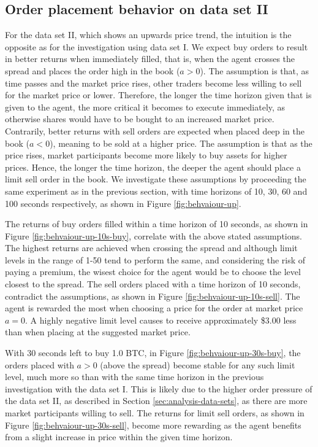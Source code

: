 \subsection{Order placement behavior on data set II}
For the data set II, which shows an upwards price trend, the intuition is the opposite as for the investigation using data set I.
We expect buy orders to result in better returns when immediately filled, that is, when the agent crosses the spread and places the order high in the book ($a>0$).
The assumption is that, as time passes and the market price rises, other traders become less willing to sell for the market price or lower.
Therefore, the longer the time horizon given that is given to the agent, the more critical it becomes to execute immediately, as otherwise shares would have to be bought to an increased market price.
Contrarily, better returns with sell orders are expected when placed deep in the book ($a<0$), meaning to be sold at a higher price.
The assumption is that as the price rises, market participants become more likely to buy assets for higher prices.
Hence, the longer the time horizon, the deeper the agent should place a limit sell order in the book.
We investigate these assumptions by proceeding the same experiment as in the previous section, with time horizons of 10, 30, 60 and 100 seconds respectively, as shown in Figure \ref{fig:behvaiour-up}.

The returns of buy orders filled within a time horizon of 10 seconds, as shown in Figure \ref{fig:behvaiour-up-10s-buy}, correlate with the above stated assumptions.
The highest returns are achieved when crossing the spread and although limit levels in the range of 1-50 tend to perform the same, and considering the risk of paying a premium, the wisest choice for the agent would be to choose the level closest to the spread.
The sell orders placed with a time horizon of 10 seconds, contradict the assumptions, as shown in Figure \ref{fig:behvaiour-up-10s-sell}.
The agent is rewarded the most when choosing a price for the order at market price $a=0$.
A highly negative limit level causes to receive approximately \$3.00 less than when placing at the suggested market price.

With 30 seconds left to buy 1.0 BTC, in Figure \ref{fig:behvaiour-up-30s-buy}, the orders placed with $a>0$ (above the spread) become stable for any such limit level, much more so than with the same time horizon in the previous investigation with the data set I.
This is likely due to the higher order pressure of the data set II, as described in Section \ref{sec:analysis-data-sets}, as there are more market participants willing to sell.
The returns for limit sell orders, as shown in Figure \ref{fig:behvaiour-up-30s-sell}, become more rewarding as the agent benefits from a slight increase in price within the given time horizon.

